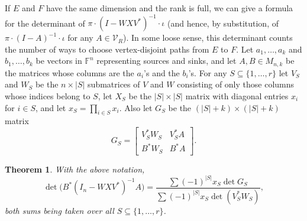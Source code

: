 \documentclass[10pt,a4paper]{amsart}
\newtheorem{thm}{Theorem}[section]
\begin{document}
If $E$ and $F$ have the same dimension and the rank is full, we can give a formula for the determinant of $\pi\cdot (I - WXV^*)^{-1}\cdot \iota$ (and hence, by substitution, of $\pi\cdot (I - A)^{-1}\cdot \iota$ for any $A \in \mathcal{V}_R$). In some loose sense, this determinant counts the number of ways to choose vertex-disjoint paths from $E$ to $F$. Let $a_1, \ldots, a_k$ and $b_1, \ldots, b_k$ be vectors in $\mathbb{F}^n$ representing sources and sinks, and let $A, B \in M_{n,k}$ be the matrices whose columns are the $a_i$'s and the $b_i$'s. For any $S \subseteq \{1, \ldots, r\}$ let $V_S$ and $W_S$ be the $n \times |S|$ submatrices of $V$ and $W$ consisting of only those columns whose indices belong to $S$, let $X_S$ be the $|S| \times |S|$ matrix with diagonal entries $x_i$ for $i \in S$, and let $x_S = \prod_{i \in S} x_i$. Also let $G_S$ be the $(|S| + k) \times (|S| + k)$ matrix $$ G_S = \left[\begin{matrix} V_S^* W_S & V_S^* A \\ B^* W_S & B^* A \end{matrix}\right].$$

\begin{thm}\label{lgthm}
With the above notation, $$\det\Big( B^* (I_n - WXV^*)^{-1} A \Big) = \frac{ \displaystyle \sum (-1)^{|S|} x_S \det G_S }{ \displaystyle \sum (-1)^{|S|} x_S \det(V_S^* W_S)},$$ both sums being taken over all $S \subseteq \{1, \ldots, r\}$.
\end{thm}
\end{document}
